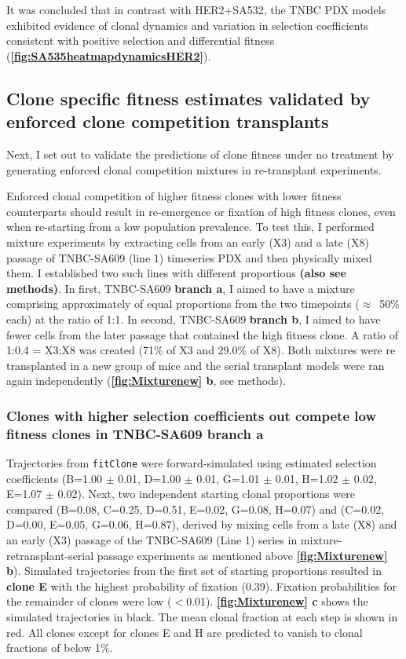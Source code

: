 It was concluded that in contrast with HER2+SA532, the TNBC PDX models exhibited evidence of clonal dynamics and variation in selection coefficients consistent with positive selection and differential fitness (\textbf{\autoref{fig:SA535heatmapdynamicsHER2}}). 


\subsection{Clone specific fitness estimates validated by enforced clone competition transplants} 
Next, I set out to validate the predictions of clone fitness under no treatment by generating enforced clonal competition mixtures in re-transplant experiments.

Enforced clonal competition of higher fitness clones with lower fitness counterparts should result in re-emergence or fixation of high fitness clones, even when re-starting from a low population prevalence. To test this, I performed mixture experiments by extracting cells from an early (X3) and a late (X8) passage of TNBC-SA609 (line 1) timeseries PDX and then physically mixed them. I established two such lines with different proportions \textbf{(also see methods)}.
In first, TNBC-SA609 \textbf{branch a}, I aimed to have a mixture comprising approximately of equal proportions from the two timepoints ($\approx$~50\% each) at the ratio of 1:1. In second, TNBC-SA609 \textbf{branch b}, I aimed to have fewer cells from the later passage that contained the high fitness clone. A ratio of 1:0.4 = X3:X8 was created (71\% of X3 and 29.0\% of X8). 
Both mixtures were re transplanted in a new group of mice and the serial transplant models were ran again independently (\textbf{\autoref{fig:Mixturenew} b}, see methods).

\subsubsection{Clones with higher selection coefficients out compete low fitness clones in TNBC-SA609 branch a}
 Trajectories from \texttt{fitClone} were forward-simulated using estimated selection coefficients (B=1.00 $\pm$ 0.01, D=1.00 $\pm$ 0.01, G=1.01 $\pm$ 0.01, H=1.02 $\pm$ 0.02, E=1.07 $\pm$ 0.02). Next, two independent starting clonal proportions were compared (B=0.08, C=0.25, D=0.51, E=0.02, G=0.08, H=0.07) and (C=0.02, D=0.00, E=0.05, G=0.06, H=0.87), derived by mixing cells from a late (X8) and an early (X3) passage of the TNBC-SA609 (Line 1) series in mixture-retransplant-serial passage experiments as mentioned above \textbf{\autoref{fig:Mixturenew} b}). Simulated trajectories from the first set of starting proportions resulted in \textbf{clone E} with the highest probability of fixation (0.39). Fixation probabilities for the remainder of clones were low ($<$0.01). \textbf{\autoref{fig:Mixturenew} c} shows the simulated trajectories in black.
The mean clonal fraction at each step is shown in red. All clones except for clones E and H are predicted to vanish to clonal fractions of below 1\%. 

